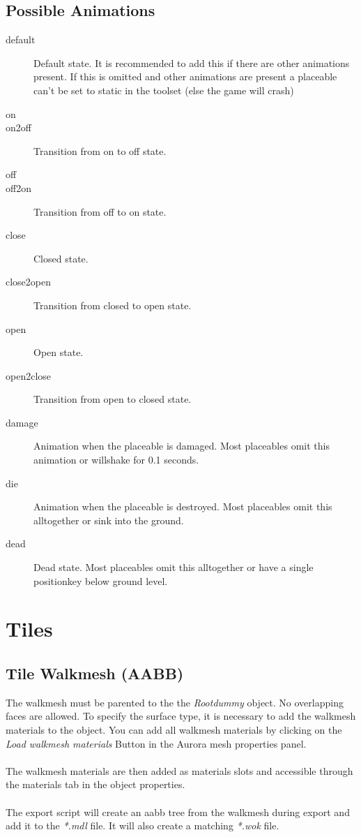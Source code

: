 \subsection*{Possible Animations}
\begin{description}
    \item[default] Default state. It is recommended to add this if there are other animations present. If this is omitted and other animations are present a placeable can't be set to static in the toolset (else the game will crash)
    \item[on]
    \item[on2off] Transition from on to off state.
    \item[off]
    \item[off2on] Transition from off to on state.
    \item[close] Closed state.
    \item[close2open] Transition from closed to open state.
    \item[open] Open state.
    \item[open2close] Transition from open to closed state.
    \item[damage] Animation when the placeable is damaged. Most placeables omit this animation or willshake for 0.1 seconds.
    \item[die] Animation when the placeable is destroyed. Most placeables omit this alltogether or sink into the ground.
    \item[dead] Dead state. Most placeables omit this alltogether or have a single positionkey below ground level.
\end{description}

\section{Tiles}

\subsection*{Tile Walkmesh (AABB)}
The walkmesh must be parented to the the {\textit{Rootdummy}} object.
No overlapping faces are allowed. To specify the surface type, it is necessary
to add the walkmesh materials to the object. You can add all walkmesh
materials by clicking on the {\textit{Load walkmesh materials}} Button in the
Aurora mesh properties panel. \\ \\

The walkmesh materials are then added as materials slots and accessible
through the materials tab in the object properties. \\ \\

The export script will create an aabb tree from the walkmesh during export
and add it to the {\textit{*.mdl}} file. It will also create a
matching {\textit{*.wok}} file.

